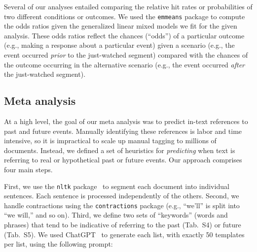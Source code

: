 \documentclass[10pt]{article}
\newcommand{\pastKeys}{S4}
\newcommand{\futureKeys}{S5}
\begin{document}
Several of our analyses entailed comparing the relative hit rates or
probabilities of two different conditions or outcomes. We used the
\texttt{emmeans} package to compute the odds ratios given the generalized
linear mixed models we fit for the given analysis. These odds ratios reflect
the chances (``odds'') of a particular outcome (e.g., making a response about a
particular event) given a scenario (e.g., the event occurred \textit{prior} to
the just-watched segment) compared with the chances of the outcome occurring in
the alternative scenario (e.g., the event occurred \textit{after} the
just-watched segment).

\subsection*{Meta analysis}

At a high level, the goal of our meta analysis was to predict in-text
references to past and future events. Manually identifying these references is
labor and time intensive, so it is impractical to scale up manual tagging to
millions of documents. Instead, we defined a set of heuristics for
\textit{predicting} when text is referring to real or hypothetical past or
future events. Our approach comprises four main steps.

First, we use the \texttt{nltk} package~\citep{BirdEtal09} to segment each
document into individual sentences. Each sentence is processed independently of
the others. Second, we handle contractions using the \texttt{contractions} package
(e.g., ``we'll'' is split into ``we will,'' and so on).  Third, we define two
sets of ``keywords'' (words and phrases) that tend to be indicative of referring
to the past (Tab.~\pastKeys) or future (Tab.~\futureKeys). We used
ChatGPT~\citep{ChatGPT} to generate each list, with exactly 50 templates per list,
using the following prompt:
\end{document}
